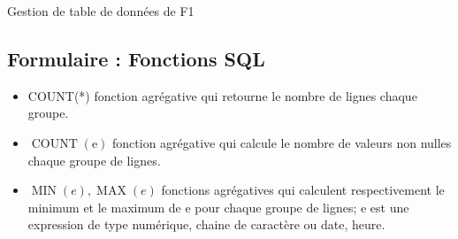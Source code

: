 \begin{exo}[PC][1][colle]{Gestion de table de données de F1}







\subsection*{Formulaire : Fonctions SQL}
\begin{itemize}
  \item COUNT(*) fonction agrégative qui retourne le nombre de lignes chaque groupe.

  \item $\operatorname{COUNT}(\mathrm{e})$ fonction agrégative qui calcule le nombre de valeurs non nulles chaque groupe de lignes.

  \item $\operatorname{MIN}(e), \operatorname{MAX}(e)$ fonctions agrégatives qui calculent respectivement le minimum et le maximum de e pour chaque groupe de lignes; e est une expression de type numérique, chaine de caractère ou date, heure.


\end{itemize}
\end{exo}
